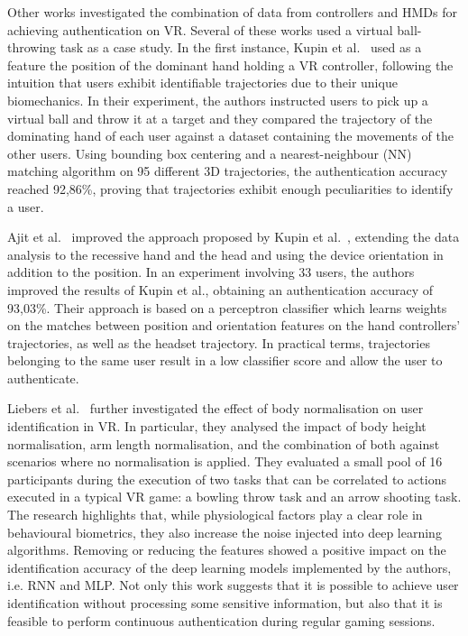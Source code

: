 \documentclass[journal]{IEEEtran}
\begin{document}
Other works investigated the combination of data from controllers and HMDs for achieving authentication on VR. Several of these works used a virtual ball-throwing task as a case study. In the first instance, Kupin et al.~\cite{kupin2019} used as a feature the position of the dominant hand holding a VR controller, following the intuition that users exhibit identifiable trajectories due to their unique biomechanics. In their experiment, the authors instructed users to pick up a virtual ball and throw it at a target and they compared the trajectory of the dominating hand of each user against a dataset containing the movements of the other users. Using bounding box centering and a nearest-neighbour (NN) matching algorithm on 95 different 3D trajectories, the authentication accuracy reached 92,86\%, proving that trajectories exhibit enough peculiarities to identify a user. %

Ajit et al.~\cite{ajit2019} improved the approach proposed by Kupin et al.~\cite{kupin2019}, extending the data analysis to the recessive hand and the head and using the device orientation in addition to the position. In an experiment involving 33 users, the authors improved the results of Kupin et al., obtaining an authentication accuracy of 93,03\%. Their approach is based on a perceptron classifier which learns weights on the matches between position and orientation features on the hand controllers' trajectories, as well as the headset trajectory. In practical terms, trajectories belonging to the same user result in a low classifier score and allow the user to authenticate.

Liebers et al.~\cite{liebers2021} further investigated the effect of body normalisation on user identification in VR. In particular, they analysed the impact of body height normalisation, arm length normalisation, and the combination of both against scenarios where no normalisation is applied.
They evaluated a small pool of 16 participants during the execution of two tasks that can be correlated to actions executed in a typical VR game: a bowling throw task and an arrow shooting task. The research highlights that, while physiological factors play a clear role in behavioural biometrics, they also increase the noise injected into deep learning algorithms. Removing or reducing the features showed a positive impact on the identification accuracy of the deep learning models implemented by the authors, i.e. RNN and MLP. Not only this work suggests that it is possible to achieve user identification without processing some sensitive information, but also that it is feasible to perform continuous authentication during regular gaming sessions.
\end{document}
